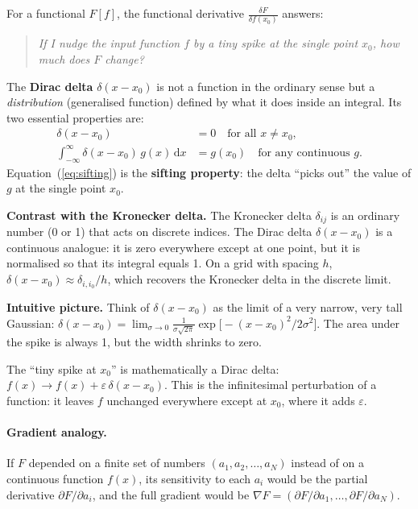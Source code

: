 \documentclass[12pt,letterpaper]{article}
\newcommand{\dd}{\mathrm{d}}
\theoremstyle{definition}
\begin{document}
For a functional $F[f]$, the functional derivative
$\frac{\delta F}{\delta f(x_0)}$ answers:
\begin{quote}
  \textit{If I nudge the input function $f$ by a tiny spike at the
  single point $x_0$, how much does $F$ change?}
\end{quote}

\begin{keyresult}[title={The Dirac Delta: Definition and Sifting Property}]
The \textbf{Dirac delta} $\delta(x - x_0)$ is not a function in the ordinary
sense but a \emph{distribution} (generalised function) defined by what it does
inside an integral.  Its two essential properties are:
\begin{align}
  \delta(x - x_0) &= 0 \quad \text{for all } x \neq x_0,
  \label{eq:dirac_zero}\\
  \int_{-\infty}^{\infty} \delta(x - x_0)\,g(x)\,\dd x &= g(x_0)
  \quad\text{for any continuous } g.
  \label{eq:sifting}
\end{align}
Equation~(\ref{eq:sifting}) is the \textbf{sifting property}: the delta
``picks out'' the value of $g$ at the single point $x_0$.

\medskip
\noindent\textbf{Contrast with the Kronecker delta.}
The Kronecker delta $\delta_{ij}$ is an ordinary number (0 or 1) that acts on
discrete indices.  The Dirac delta $\delta(x-x_0)$ is a continuous analogue:
it is zero everywhere except at one point, but it is normalised so that its
integral equals 1.  On a grid with spacing $h$, $\delta(x-x_0)\approx \delta_{i,i_0}/h$,
which recovers the Kronecker delta in the discrete limit.

\medskip
\noindent\textbf{Intuitive picture.}
Think of $\delta(x-x_0)$ as the limit of a very narrow, very tall Gaussian:
$\delta(x-x_0) = \lim_{\sigma\to 0}
\frac{1}{\sigma\sqrt{2\pi}}\exp\!\bigl[-(x-x_0)^2/2\sigma^2\bigr]$.
The area under the spike is always 1, but the width shrinks to zero.
\end{keyresult}

The ``tiny spike at $x_0$'' is mathematically a Dirac delta:
$f(x) \to f(x) + \varepsilon\,\delta(x - x_0)$.
This is the infinitesimal perturbation of a function: it leaves $f$
unchanged everywhere except at $x_0$, where it adds $\varepsilon$.

\paragraph{Gradient analogy.}
If $F$ depended on a finite set of numbers $(a_1, a_2, \ldots, a_N)$
instead of on a continuous function $f(x)$, its sensitivity to each
$a_i$ would be the partial derivative $\partial F/\partial a_i$, and
the full gradient would be
$\nabla F = (\partial F/\partial a_1, \ldots, \partial F/\partial a_N)$.
\end{document}
